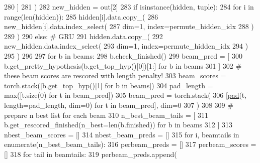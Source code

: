 \begin{DoxyCode}
280                         ]
281                     )
282                     new\_hidden = out[2]
283                     \textcolor{keywordflow}{if} isinstance(hidden, tuple):
284                         \textcolor{keywordflow}{for} i \textcolor{keywordflow}{in} range(len(hidden)):
285                             hidden[i].data.copy\_(
286                                 new\_hidden[i].data.index\_select(
287                                     dim=1, index=permute\_hidden\_idx
288                                 )
289                             )
290                     \textcolor{keywordflow}{else}:  \textcolor{comment}{# GRU}
291                         hidden.data.copy\_(
292                             new\_hidden.data.index\_select(
293                                 dim=1, index=permute\_hidden\_idx
294                             )
295                         )
296 
297                 \textcolor{keywordflow}{for} b \textcolor{keywordflow}{in} beams:
298                     b.check\_finished()
299                 beam\_pred = [
300                     b.get\_pretty\_hypothesis(b.get\_top\_hyp()[0])[1:] \textcolor{keywordflow}{for} b \textcolor{keywordflow}{in} beams
301                 ]
302                 \textcolor{comment}{# these beam scores are rescored with length penalty!}
303                 beam\_scores = torch.stack([b.get\_top\_hyp()[1] \textcolor{keywordflow}{for} b \textcolor{keywordflow}{in} beams])
304                 pad\_length = max([t.size(0) \textcolor{keywordflow}{for} t \textcolor{keywordflow}{in} beam\_pred])
305                 beam\_pred = torch.stack(
306                     [\hyperlink{namespaceparlai_1_1agents_1_1legacy__agents_1_1seq2seq_1_1modules__v0_afab760d03d96d6a368953b7173ea189a}{pad}(t, length=pad\_length, dim=0) \textcolor{keywordflow}{for} t \textcolor{keywordflow}{in} beam\_pred], dim=0
307                 )
308 
309                 \textcolor{comment}{#  prepare n best list for each beam}
310                 n\_best\_beam\_tails = [
311                     b.get\_rescored\_finished(n\_best=len(b.finished)) \textcolor{keywordflow}{for} b \textcolor{keywordflow}{in} beams
312                 ]
313                 nbest\_beam\_scores = []
314                 nbest\_beam\_preds = []
315                 \textcolor{keywordflow}{for} i, beamtails \textcolor{keywordflow}{in} enumerate(n\_best\_beam\_tails):
316                     perbeam\_preds = []
317                     perbeam\_scores = []
318                     \textcolor{keywordflow}{for} tail \textcolor{keywordflow}{in} beamtails:
319                         perbeam\_preds.append(

\end{DoxyCode}
